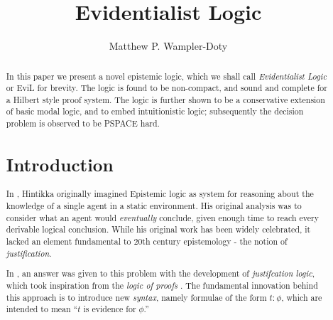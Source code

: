 \documentclass[11pt]{article}
\title{Evidentialist Logic}
\author{Matthew P. Wampler-Doty}
\date{}                                           %
\begin{document}
\maketitle
\begin{abstract} In this paper we present a novel epistemic logic, which we shall call \emph{Evidentialist Logic} or \textsf{EviL} for brevity.  The logic is found to be non-compact, and sound and complete for a Hilbert style proof system.  The logic is further shown to be a conservative extension of basic modal logic, and to embed intuitionistic logic; subsequently the decision problem is observed to be \textsf{PSPACE} hard.  

\section{Introduction}

In \cite{hintikka1962kab}, Hintikka originally imagined Epistemic logic as system for reasoning about the knowledge of a single agent in a static environment.  His original analysis was to consider what an agent would \emph{eventually} conclude, given enough time to reach every derivable logical conclusion.  While his original work has been widely celebrated, it lacked an element fundamental to 20th century epistemology - the notion of \emph{justification}.

In \cite{artemov2005iji}, an answer was given to this problem with the development of \emph{justifcation logic}, which took inspiration from the \emph{logic of proofs} \citep{artemov1994lp}.  The fundamental innovation behind this approach is to introduce new \emph{syntax}, namely formulae of the form $t: \phi$, which are intended to mean ``$t$ is evidence for $\phi$.''


\end{abstract}
\end{document}
